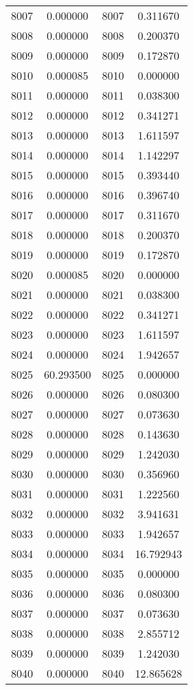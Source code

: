 \documentclass[12pt]{article}
\begin{document}
\begin{longtable}{@{}cccc@{}}
8007 & 0.000000 & 8007 & 0.311670 \\
8008 & 0.000000 & 8008 & 0.200370 \\
8009 & 0.000000 & 8009 & 0.172870 \\
8010 & 0.000085 & 8010 & 0.000000 \\
8011 & 0.000000 & 8011 & 0.038300 \\
8012 & 0.000000 & 8012 & 0.341271 \\
8013 & 0.000000 & 8013 & 1.611597 \\
8014 & 0.000000 & 8014 & 1.142297 \\
8015 & 0.000000 & 8015 & 0.393440 \\
8016 & 0.000000 & 8016 & 0.396740 \\
8017 & 0.000000 & 8017 & 0.311670 \\
8018 & 0.000000 & 8018 & 0.200370 \\
8019 & 0.000000 & 8019 & 0.172870 \\
8020 & 0.000085 & 8020 & 0.000000 \\
8021 & 0.000000 & 8021 & 0.038300 \\
8022 & 0.000000 & 8022 & 0.341271 \\
8023 & 0.000000 & 8023 & 1.611597 \\
8024 & 0.000000 & 8024 & 1.942657 \\
8025 & 60.293500 & 8025 & 0.000000 \\
8026 & 0.000000 & 8026 & 0.080300 \\
8027 & 0.000000 & 8027 & 0.073630 \\
8028 & 0.000000 & 8028 & 0.143630 \\
8029 & 0.000000 & 8029 & 1.242030 \\
8030 & 0.000000 & 8030 & 0.356960 \\
8031 & 0.000000 & 8031 & 1.222560 \\
8032 & 0.000000 & 8032 & 3.941631 \\
8033 & 0.000000 & 8033 & 1.942657 \\
8034 & 0.000000 & 8034 & 16.792943 \\
8035 & 0.000000 & 8035 & 0.000000 \\
8036 & 0.000000 & 8036 & 0.080300 \\
8037 & 0.000000 & 8037 & 0.073630 \\
8038 & 0.000000 & 8038 & 2.855712 \\
8039 & 0.000000 & 8039 & 1.242030 \\
8040 & 0.000000 & 8040 & 12.865628 \\

\end{longtable}
\end{document}
